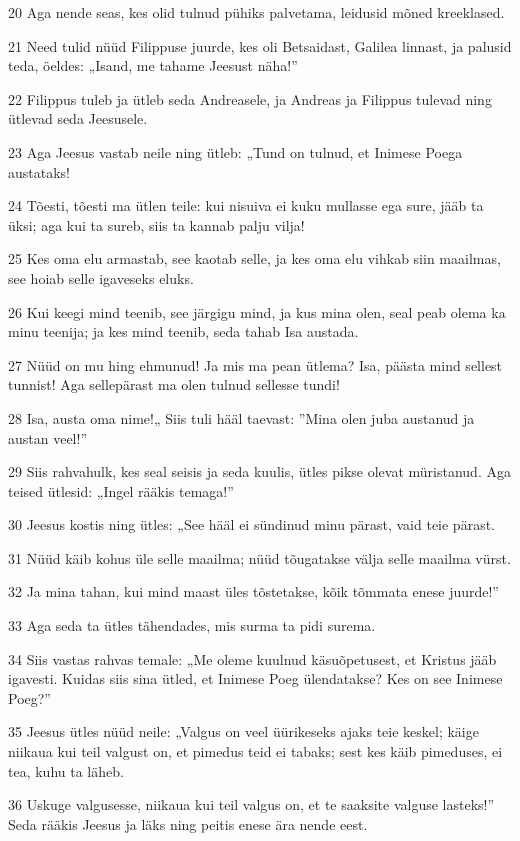 \par 20 Aga nende seas, kes olid tulnud pühiks palvetama, leidusid mõned kreeklased.
\par 21 Need tulid nüüd Filippuse juurde, kes oli Betsaidast, Galilea linnast, ja palusid teda, öeldes: „Isand, me tahame Jeesust näha!”
\par 22 Filippus tuleb ja ütleb seda Andreasele, ja Andreas ja Filippus tulevad ning ütlevad seda Jeesusele.
\par 23 Aga Jeesus vastab neile ning ütleb: „Tund on tulnud, et Inimese Poega austataks!
\par 24 Tõesti, tõesti ma ütlen teile: kui nisuiva ei kuku mullasse ega sure, jääb ta üksi; aga kui ta sureb, siis ta kannab palju vilja!
\par 25 Kes oma elu armastab, see kaotab selle, ja kes oma elu vihkab siin maailmas, see hoiab selle igaveseks eluks.
\par 26 Kui keegi mind teenib, see järgigu mind, ja kus mina olen, seal peab olema ka minu teenija; ja kes mind teenib, seda tahab Isa austada.
\par 27 Nüüd on mu hing ehmunud! Ja mis ma pean ütlema? Isa, päästa mind sellest tunnist! Aga sellepärast ma olen tulnud sellesse tundi!
\par 28 Isa, austa oma nime!„ Siis tuli hääl taevast: ”Mina olen juba austanud ja austan veel!”
\par 29 Siis rahvahulk, kes seal seisis ja seda kuulis, ütles pikse olevat müristanud. Aga teised ütlesid: „Ingel rääkis temaga!”
\par 30 Jeesus kostis ning ütles: „See hääl ei sündinud minu pärast, vaid teie pärast.
\par 31 Nüüd käib kohus üle selle maailma; nüüd tõugatakse välja selle maailma vürst.
\par 32 Ja mina tahan, kui mind maast üles tõstetakse, kõik tõmmata enese juurde!”
\par 33 Aga seda ta ütles tähendades, mis surma ta pidi surema.
\par 34 Siis vastas rahvas temale: „Me oleme kuulnud käsuõpetusest, et Kristus jääb igavesti. Kuidas siis sina ütled, et Inimese Poeg ülendatakse? Kes on see Inimese Poeg?”
\par 35 Jeesus ütles nüüd neile: „Valgus on veel üürikeseks ajaks teie keskel; käige niikaua kui teil valgust on, et pimedus teid ei tabaks; sest kes käib pimeduses, ei tea, kuhu ta läheb.
\par 36 Uskuge valgusesse, niikaua kui teil valgus on, et te saaksite valguse lasteks!” Seda rääkis Jeesus ja läks ning peitis enese ära nende eest.

